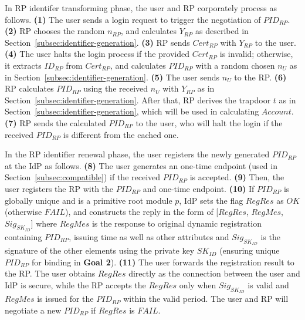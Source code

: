 In RP identifer transforming phase, the user and RP corporately process as follows. \textbf{(1)} The user sends a login request to trigger the negotiation of $PID_{RP}$. \textbf{(2)} RP chooses the random $n_{RP}$, and calculates $Y_{RP}$ as described in Section~\ref{subsec:identifier-generation}. \textbf{(3)} RP sends $Cert_{RP}$ with $Y_{RP}$ to the user.  \textbf{(4)} The user halts the login process if the provided $Cert_{RP}$ is invalid; otherwise, it extracts $ID_{RP}$ from $Cert_{RP}$, and calculates $PID_{RP}$ with a random chosen $n_U$ as in Section~\ref{subsec:identifier-generation}. \textbf{(5)} The user sends $n_U$ to the RP. \textbf{(6)} RP calculates $PID_{RP}$ using the received $n_U$ with $Y_{RP}$ as in Section~\ref{subsec:identifier-generation}. After that, RP derives the trapdoor $t$ as in Section~\ref{subsec:identifier-generation}, which will be used in calculating $Account$. \textbf{(7)} RP sends the calculated $PID_{RP}$ to the user, who will halt the login if the received $PID_{RP}$ is different from the cached one.

In the RP identifier renewal phase, the user registers the newly generated $PID_{RP}$ at the IdP as follows. \textbf{(8)} The user generates an one-time endpoint (used in Section~\ref{subsec:compatible}) if the received $PID_{RP}$ is accepted. \textbf{(9)} Then, the user registers the RP with the $PID_{RP}$ and one-time endpoint. \textbf{(10)} If $PID_{RP}$ is globally unique and is a primitive root module $p$, IdP sets the flag $RegRes$ as $OK$ (otherwise $FAIL$), and constructs the reply in the form of
[$RegRes$, $RegMes$, $Sig_{SK_{ID}}$]
where $RegMes$ is the response to original dynamic registration containing $PID_{RP}$, issuing time as well as other attributes and $Sig_{SK_{ID}}$ is the signature of the other elements using the private key $SK_{ID}$ (ensuring unique $PID_{RP}$ for binding in \textbf{Goal 2}). \textbf{(11)} The user forwards the registration result to the RP. The user obtains $RegRes$ directly as the connection between the user and IdP is secure, while the RP accepts the $RegRes$ only when $Sig_{SK_{ID}}$ is valid
and $RegMes$ is issued for the $PID_{RP}$ within the valid period. The user and RP will negotiate a new $PID_{RP}$ if $RegRes$ is $FAIL$.

